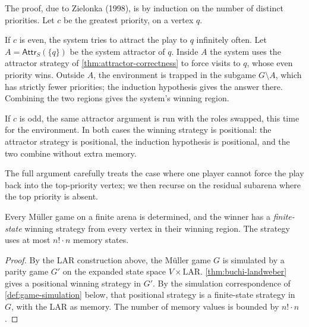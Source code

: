 \begin{formaldetails}
The proof, due to Zielonka (1998), is by induction on the number of
distinct priorities.  Let $c$ be the greatest priority, on a vertex $q$.

If $c$ is even, the system tries to attract the play to $q$
infinitely often.  Let $A=\mathsf{Attr}_S(\{q\})$ be the system
attractor of $q$.  Inside $A$ the system uses the attractor strategy of
\cref{thm:attractor-correctness} to force visits to $q$, whose even
priority wins.  Outside $A$, the environment is trapped in the subgame
$G\setminus A$, which has strictly fewer priorities; the induction
hypothesis gives the answer there.  Combining the two regions gives
the system's winning region.

If $c$ is odd, the same attractor argument is run with the roles
swapped, this time for the environment.  In both cases the winning
strategy is positional: the attractor strategy is positional, the
induction hypothesis is positional, and the two combine without extra
memory.

The full argument carefully treats the case where one player cannot
force the play back into the top-priority vertex; we then recurse on
the residual subarena where the top priority is absent.
\end{formaldetails}


\begin{corollary}
\label{cor:muller-finite-state}
Every M\"uller game on a finite arena is determined, and the winner has
a \emph{finite-state} winning strategy from every vertex in their
winning region.  The strategy uses at most $n!\cdot n$ memory states.
\end{corollary}

\begin{proof}
By the LAR construction above, the M\"uller game $G$ is simulated by a
parity game $G'$ on the expanded state space $V\times\mathrm{LAR}$.
\cref{thm:buchi-landweber} gives a positional winning strategy in $G'$.
By the simulation correspondence of \cref{def:game-simulation} below,
that positional strategy is a finite-state strategy in $G$, with the
LAR as memory.  The number of memory values is bounded by
$n!\cdot n$.
\end{proof}

